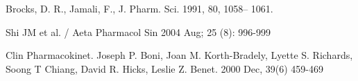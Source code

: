 \documentclass[12pt]{article} %
\begin{document}
\newpage

\begin{thebibliography}{100}
	Brocks, D. R., Jamali, F., J. Pharm. Sci. 1991, 80, 1058– 1061.


        Shi JM et al. / Aeta Pharmacol Sin 2004 Aug; 25 (8): 996-999

        Clin Pharmacokinet. Joseph P. Boni, Joan M. Korth-Bradely, Lyette S. Richards, Soong T Chiang, David R. Hicks, Leslie Z. Benet. 2000 Dec, 39(6) 459-469

\end{thebibliography}
\end{document}
